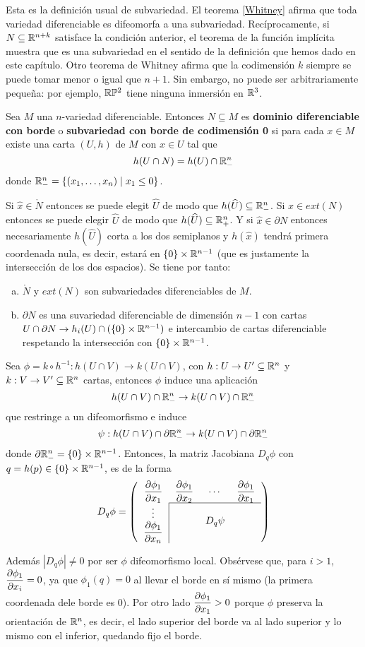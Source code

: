 \documentclass[CV.tex]{subfiles}
\begin{document}
Esta es la definición usual de subvariedad. El teorema \ref{Whitney} afirma que toda variedad diferenciable es difeomorfa a una subvariedad. Recíprocamente, si $N\subseteq\mathbb{R}^{n+k}$ satisface la condición anterior, el teorema de la función implícita muestra que es una subvariedad en el sentido de la definición que hemos dado en este capítulo. Otro teorema de Whitney afirma que la codimensión $k$ siempre se puede tomar menor o igual que $n+1$. Sin embargo, no puede ser arbitrariamente pequeña: por ejemplo, $\mathbb{R}\mathbb{P}^2$ tiene ninguna inmersión en $\mathbb{R}^3$. 

\begin{defi}
Sea $M$ una $n$-variedad diferenciable. Entonces $N\subseteq M$ es \textbf{dominio diferenciable con borde} o \textbf{subvariedad con borde de codimensión 0} si para cada $x\in M$ existe una carta $(U,h)$ de $M$ con $x\in U$ tal que 
\[
h(U\cap N)=h(U)\cap\mathbb{R}^n_-
\]
donde $\mathbb{R}^n_-=\{(x_1,\dots, x_n)\mid x_1\leq 0\}$. 
\end{defi}

Si $\hat{x}\in \mathring{N}$ entonces se puede elegit $\widehat{U}$ de modo que $h(\widehat{U})\subseteq\mathbb{R}^n_-$. Si $\hat{x}\in ext(N)$ entonces se puede elegir $\widehat{U}$ de modo que $h(\widehat{U})\subseteq\mathbb{R}^n_+$. Y si $\hat{x}\in\partial N$ entonces necesariamente $h(\widehat{U})$ corta a los dos semiplanos y $h(\hat{x})$ tendrá primera coordenada nula, es decir, estará en $\{0\}\times \mathbb{R}^{n-1}$ (que es justamente la intersección de los dos espacios). Se tiene por tanto:
\begin{enumerate}[a)]
\item $\mathring{N}$ y $ext(N)$ son subvariedades diferenciables de $M$.
\item $\partial N$ es una suvariedad diferenciable de dimensión $n-1$ con cartas $U\cap \partial N\to h_i(U)\cap (\{0\}\times\mathbb{R}^{n-1})$ e intercambio de cartas diferenciable respetando la intersección con $\{0\}\times\mathbb{R}^{n-1}$. 
\end{enumerate}
Sea $\phi=k\circ h^{-1}:h(U\cap V)\to k(U\cap V)$, con $h:U\to U'\subseteq\mathbb{R}^n$ y $k:V\to V'\subseteq\mathbb{R}^n$ cartas, entonces $\phi$ induce una aplicación 
\[
h(U\cap V)\cap\mathbb{R}^n_-\to k(U\cap V)\cap\mathbb{R}^n_-
\]
que restringe a un difeomorfismo e induce 
\[
\psi:h(U\cap V)\cap\partial\mathbb{R}^n_-\to k(U\cap V)\cap\partial\mathbb{R}^n_-
\]
donde $\partial\mathbb{R}^n_-=\{0\}\times\mathbb{R}^{n-1}$. Entonces, la matriz Jacobiana $D_q\phi$ con $q=h(p)\in\{0\}\times\mathbb{R}^{n-1}$, es de la forma
\[
D_q\phi=\left(
\begin{tabular}{cccc}
$\dparcial{\phi_1}{x_1}$ & $\dparcial{\phi_1}{x_2}$ & $\cdots$ & $\dparcial{\phi_1}{x_1}$\\\cline{2-4}
\multicolumn{1}{c|}{$\vdots$}  & &\multirow{2}{*}{$D_q\psi$} & \\
\multicolumn{1}{c|}{$\dparcial{\phi_1}{x_n}$} & & & 
\end{tabular}
 \right)
\]

Además $|D_q\phi|\neq 0$ por ser $\phi$ difeomorfismo local. Obsérvese que, para $i>1$, $\dfrac{\partial \phi_1}{\partial x_i}=0$, ya que $\phi_1(q)=0$ al llevar el borde en sí mismo (la primera coordenada dele borde es 0). Por otro lado  $\dfrac{\partial \phi_1}{\partial x_1}>0$ porque $\phi$ preserva la orientación de $\mathbb{R}^n$, es decir, el lado superior del borde va al lado superior y lo mismo con el inferior, quedando fijo el borde. 
\end{document}
